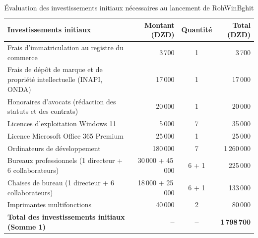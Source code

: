 \begin{table}[H]
\centering
\small
\begin{tabularx}{\textwidth}{|X|r|c|r|}
\hline
\rowcolor{rohlight}
\textbf{Investissements initiaux} & \textbf{Montant (DZD)} & \textbf{Quantité} & \textbf{Total (DZD)} \\
\hline
Frais d'immatriculation au registre du commerce & 3\,700 & 1 & 3\,700 \\
\hline
Frais de dépôt de marque et de propriété intellectuelle (INAPI, ONDA) & 17\,000 & 1 & 17\,000 \\
\hline
Honoraires d'avocats (rédaction des statuts et des contrats) & 20\,000 & 1 & 20\,000 \\
\hline
Licences d'exploitation Windows 11 & 5\,000 & 7 & 35\,000 \\
\hline
Licence Microsoft Office 365 Premium & 25\,000 & 1 & 25\,000 \\
\hline
Ordinateurs de développement & 180\,000 & 7 & 1\,260\,000 \\
\hline
Bureaux professionnels (1 directeur + 6 collaborateurs) & 30\,000 + 45\,000 & 6 + 1 & 225\,000 \\
\hline
Chaises de bureau (1 directeur + 6 collaborateurs) & 18\,000 + 25\,000 & 6 + 1 & 133\,000 \\
\hline
Imprimantes multifonctions & 40\,000 & 2 & 80\,000 \\
\hline
\rowcolor{rohlight}
\textbf{Total des investissements initiaux (Somme 1)} & \textbf{--} & \textbf{--} & \textbf{1\,798\,700} \\
\hline
\end{tabularx}
  \caption{Évaluation des investissements initiaux nécessaires au lancement de RohWinBghit}
  \label{tab:investissements}
\end{table}

